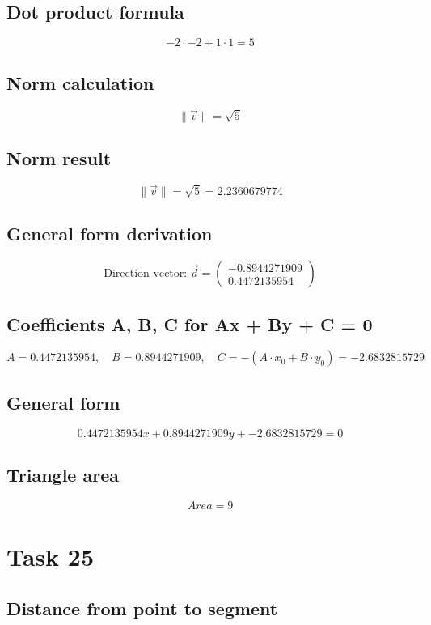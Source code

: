 \documentclass{article}
\begin{document}
\subsection*{ \vspace{1em} Dot product formula}
\[
-2 \cdot -2 + 1 \cdot 1 = 5
\]
\subsection*{ \vspace{1em} Norm calculation}
\[
\|\vec{v}\| = \sqrt{5}
\]
\subsection*{ \vspace{1em} Norm result}
\[
\|\vec{v}\| = \sqrt{5} = 2.2360679774
\]
\subsection*{ \vspace{1em} General form derivation}
\[
\text{Direction vector: } \vec{d} = \begin{pmatrix}-0.8944271909 \\ 0.4472135954\end{pmatrix}
\]
\subsection*{ \vspace{1em} Coefficients A, B, C for Ax + By + C = 0}
\[
A = 0.4472135954,\quad B = 0.8944271909,\quad C = - (A \cdot x_0 + B \cdot y_0) = -2.6832815729
\]
\subsection*{ \vspace{1em} General form}
\[
0.4472135954x + 0.8944271909y + -2.6832815729 = 0
\]
\subsection*{ \vspace{1em} Triangle area}
\[
Area = 9
\]
\bigskip

\hrulefill
\bigskip

\section*{Task 25}

\subsection*{Distance from point to segment}
\end{document}
